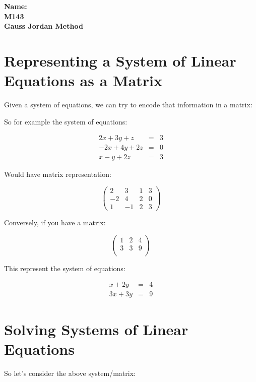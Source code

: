 \documentclass[10pt]{article}
\theoremstyle{definition}
\begin{document}
%

{\bf Name:} \hrulefill\hrulefill\hrulefill\\
{\bf M143} \qquad \qquad \\
{\bf Gauss Jordan Method }\\ %



\section{Representing a System of Linear Equations as a Matrix}

Given a system of equations, we can try to encode that information in a matrix:

So for example the system of equations:

\begin{eqnarray*}
2x+3y+z&=&3\\
-2x+4y+2z&=&0\\
x-y+2z&=&3
\end{eqnarray*}

Would have matrix representation:

$$ \left( \begin{array}{rrr|r}
2 & 3 & 1& 3\\
-2 & 4 & 2 & 0\\
1 & -1 & 2 & 3
\end{array}\right)$$

Conversely, if you have a matrix:

$$ \left( \begin{array}{rr|r}
1 & 2 & 4\\
3 & 3  & 9\\
\end{array}\right)$$

This represent the system of equations:


\begin{eqnarray*}
x+2y&=&4\\
3x+3y&=&9
\end{eqnarray*}

\section{Solving Systems of Linear Equations}

So let's consider the above system/matrix:
\end{document}
